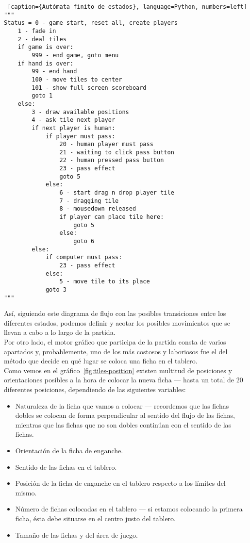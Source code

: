 \begin{lstlisting} [caption={Autómata finito de estados}, language=Python, numbers=left]
"""
Status = 0 - game start, reset all, create players
    1 - fade in
    2 - deal tiles
    if game is over:
        999 - end game, goto menu
    if hand is over:
        99 - end hand
        100 - move tiles to center
        101 - show full screen scoreboard
        goto 1
    else:
        3 - draw available positions
        4 - ask tile next player
        if next player is human:
            if player must pass:
                20 - human player must pass
                21 - waiting to click pass button
                22 - human pressed pass button
                23 - pass effect
                goto 5
            else:
                6 - start drag n drop player tile
                7 - dragging tile
                8 - mousedown released
                if player can place tile here:
                    goto 5
                else:
                    goto 6
        else:
            if computer must pass:
                23 - pass effect
            else:
                5 - move tile to its place
            goto 3
"""
\end{lstlisting}

Así, siguiendo este diagrama de flujo con las posibles transiciones entre los diferentes estados, podemos definir y acotar
los posibles movimientos que se llevan a cabo a lo largo de la partida. \\

Por otro lado, el motor gráfico que participa de la partida consta de varios apartados y, probablemente, uno de los más costosos y
laboriosos fue el del método que decide en qué lugar se coloca una ficha en el tablero. \\

Como vemos en el gráfico~\ref{fig:tiles-position} existen multitud de posiciones y orientaciones posibles a la hora de colocar
la nueva ficha --- hasta un total de 20 diferentes posiciones, dependiendo de las siguientes variables:
\begin{itemize}
    \item Naturaleza de la ficha que vamos a colocar --- recordemos que las fichas dobles se colocan de forma
            perpendicular al sentido del flujo de las fichas, mientras que las fichas que no son dobles continúan con
            el sentido de las fichas.
    \item Orientación de la ficha de enganche.
    \item Sentido de las fichas en el tablero.
    \item Posición de la ficha de enganche en el tablero respecto a los límites del mismo.
    \item Número de fichas colocadas en el tablero --- si estamos colocando la primera ficha, ésta debe situarse en
            el centro justo del tablero.
    \item Tamaño de las fichas y del área de juego.
\end{itemize}

